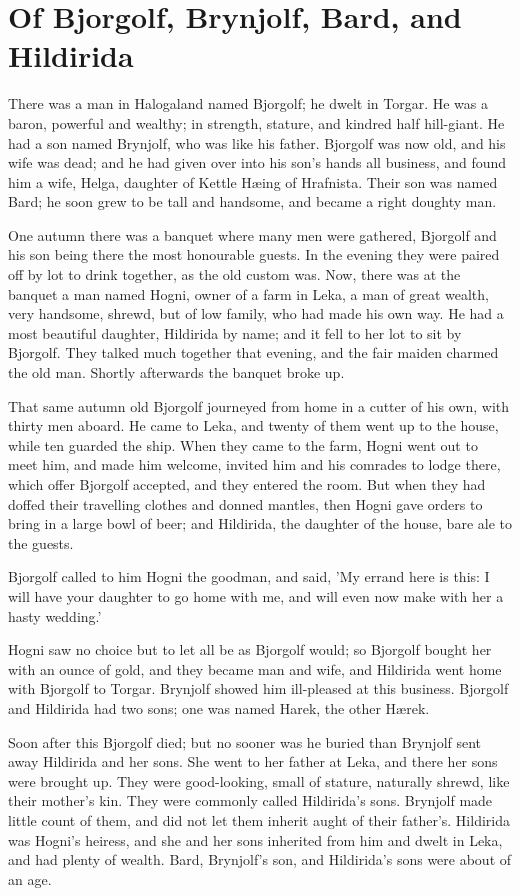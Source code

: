 \chapter{Of Bjorgolf, Brynjolf, Bard, and Hildirida}
There was a man in Halogaland named Bjorgolf; he dwelt in Torgar. He was a baron, powerful and wealthy; in strength, stature, and kindred half hill-giant. He had a son named Brynjolf, who was like his father. Bjorgolf was now old, and his wife was dead; and he had given over into his son's hands all business, and found him a wife, Helga, daughter of Kettle H\ae ing of Hrafnista. Their son was named Bard; he soon grew to be tall and handsome, and became a right doughty man.

One autumn there was a banquet where many men were gathered, Bjorgolf and his son being there the most honourable guests. In the evening they were paired off by lot to drink together, as the old custom was. Now, there was at the banquet a man named Hogni, owner of a farm in Leka, a man of great wealth, very handsome, shrewd, but of low family, who had made his own way. He had a most beautiful daughter, Hildirida by name; and it fell to her lot to sit by Bjorgolf. They talked much together that evening, and the fair maiden charmed the old man. Shortly afterwards the banquet broke up.

That same autumn old Bjorgolf journeyed from home in a cutter of his own, with thirty men aboard. He came to Leka, and twenty of them went up to the house, while ten guarded the ship. When they came to the farm, Hogni went out to meet him, and made him welcome, invited him and his comrades to lodge there, which offer Bjorgolf accepted, and they entered the room. But when they had doffed their travelling clothes and donned mantles, then Hogni gave orders to bring in a large bowl of beer; and Hildirida, the daughter of the house, bare ale to the guests.

Bjorgolf called to him Hogni the goodman, and said, 'My errand here is this: I will have your daughter to go home with me, and will even now make with her a hasty wedding.'

Hogni saw no choice but to let all be as Bjorgolf would; so Bjorgolf bought her with an ounce of gold, and they became man and wife, and Hildirida went home with Bjorgolf to Torgar. Brynjolf showed him ill-pleased at this business. Bjorgolf and Hildirida had two sons; one was named Harek, the other H\ae rek.

Soon after this Bjorgolf died; but no sooner was he buried than Brynjolf sent away Hildirida and her sons. She went to her father at Leka, and there her sons were brought up. They were good-looking, small of stature, naturally shrewd, like their mother's kin. They were commonly called Hildirida's sons. Brynjolf made little count of them, and did not let them inherit aught of their father's. Hildirida was Hogni's heiress, and she and her sons inherited from him and dwelt in Leka, and had plenty of wealth. Bard, Brynjolf's son, and Hildirida's sons were about of an age.

